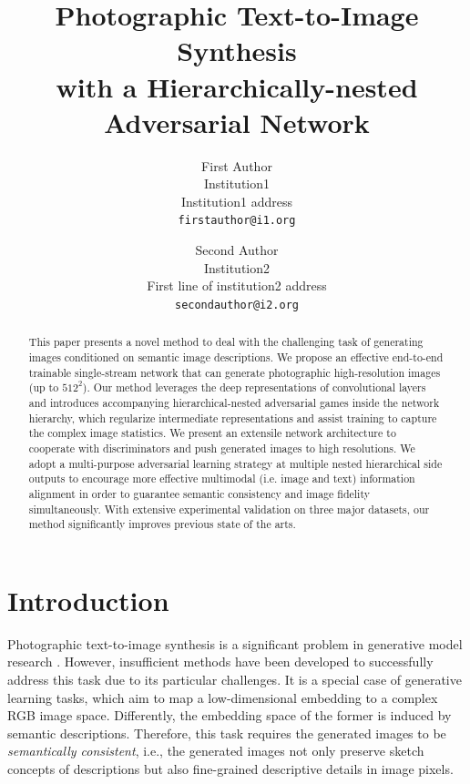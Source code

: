 \documentclass[10pt,twocolumn,letterpaper]{article}
\begin{document}
\title{Photographic Text-to-Image Synthesis \\ with a Hierarchically-nested Adversarial Network}

\author{First Author\\
Institution1\\
Institution1 address\\
{\tt\small firstauthor@i1.org}
\and
Second Author\\
Institution2\\
First line of institution2 address\\
{\tt\small secondauthor@i2.org}
}

\maketitle

\begin{abstract}
This paper presents a novel method to deal with the challenging task of generating images conditioned on semantic image descriptions. We propose an effective end-to-end trainable single-stream network that can generate photographic high-resolution images (up to $512^2$). Our method leverages the deep representations of convolutional layers and introduces accompanying hierarchical-nested adversarial games inside the network hierarchy, which regularize intermediate representations and assist training to capture the complex image statistics. We present an extensile network architecture to cooperate with discriminators and push generated images to high resolutions. 
We adopt a multi-purpose adversarial learning strategy at multiple nested hierarchical side outputs to encourage more effective multimodal (i.e. image and text) information alignment in order to guarantee semantic consistency and image fidelity simultaneously. 
With extensive experimental validation on three major datasets, our method significantly improves previous state of the arts. 

\end{abstract}


\section{Introduction}
Photographic text-to-image synthesis is a significant problem in generative model research \cite{reed2016generative}. However, insufficient methods have been developed to successfully address this task due to its particular challenges. It is a special case of generative learning tasks, which aim to map a low-dimensional embedding to a complex RGB image space. Differently, the embedding space of the former is induced by semantic descriptions. Therefore, this task requires the generated images to be \textit{semantically consistent}, i.e., the generated images not only preserve sketch concepts of descriptions but also fine-grained descriptive details in image pixels. 
\end{document}
